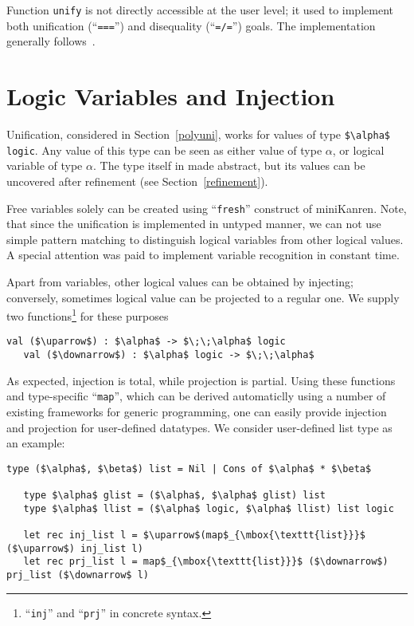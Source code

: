 \documentclass[10pt, oneside, nocopyrightspace]{sigplanconf}
\begin{document}
Function \lstinline{unify} is not directly accessible at the user level; it used
to implement both unification (``\lstinline{===}'') and disequality (``\lstinline{=/=}'') 
goals. The implementation generally follows~\cite{CKanren}.

\section{Logic Variables and Injection}
\label{logics}

Unification, considered in Section~\ref{polyuni}, works for values of type \lstinline[mathescape=true]{$\alpha$ logic}. 
Any value of this type can be seen as either value of type $\alpha$, or logical variable of type $\alpha$. The type 
itself in made abstract, but its values can be uncovered after refinement (see Section~\ref{refinement}).

Free variables solely can be created using ``\lstinline{fresh}'' construct of miniKanren. Note, that 
since the unification is implemented in untyped manner, we can not use simple pattern matching to
distinguish logical variables from other logical values. A special attention was paid to implement
variable recognition in constant time.

Apart from variables, other logical values can be obtained by injecting; conversely, sometimes
logical value can be projected to a regular one. We supply two functions\footnote{``\lstinline{inj}'' and ``\lstinline{prj}'' in concrete syntax.}
for these purposes

\begin{lstlisting}[mathescape=true]
   val ($\uparrow$) : $\alpha$ -> $\;\;\alpha$ logic
   val ($\downarrow$) : $\alpha$ logic -> $\;\;\alpha$
\end{lstlisting}

As expected, injection is total, while projection is partial. Using these functions and type-specific
``\lstinline{map}'', which can be derived automaticlly using a number of existing frameworks for
generic programming, one can easily provide injection and projection for user-defined datatypes. We
consider user-defined list type as an example:

\begin{lstlisting}[mathescape=true]
   type ($\alpha$, $\beta$) list = Nil | Cons of $\alpha$ * $\beta$
   
   type $\alpha$ glist = ($\alpha$, $\alpha$ glist) list
   type $\alpha$ llist = ($\alpha$ logic, $\alpha$ llist) list logic

   let rec inj_list l = $\uparrow$(map$_{\mbox{\texttt{list}}}$ ($\uparrow$) inj_list l) 
   let rec prj_list l = map$_{\mbox{\texttt{list}}}$ ($\downarrow$) prj_list ($\downarrow$ l)
\end{lstlisting}
\end{document}
